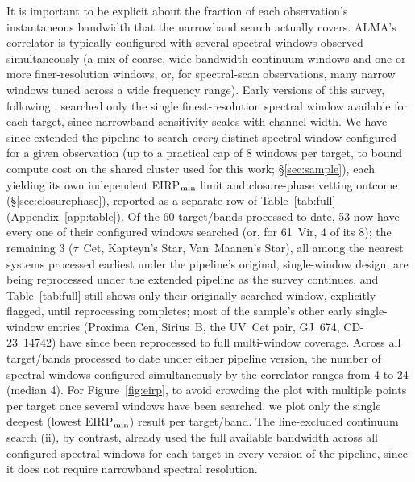\documentclass{openjournal}
\begin{document}
It is important to be explicit about the fraction of each observation's
instantaneous bandwidth that the narrowband search actually covers.
ALMA's correlator is typically configured with several spectral windows
observed simultaneously (a mix of coarse, wide-bandwidth continuum
windows and one or more finer-resolution windows, or, for spectral-scan
observations, many narrow windows tuned across a wide frequency range).
Early versions of this survey, following \citet{Mason2024}, searched
only the single finest-resolution spectral window available for each
target, since narrowband sensitivity scales with channel width. We have
since extended the pipeline to search \emph{every} distinct spectral
window configured for a given observation (up to a practical cap of 8
windows per target, to bound compute cost on the shared cluster used for
this work; \S\ref{sec:sample}), each yielding its own independent
EIRP$_{\rm min}$ limit and closure-phase vetting outcome
(\S\ref{sec:closurephase}), reported as a separate row of
Table~\ref{tab:full} (Appendix~\ref{app:table}). Of the 60 target/bands
processed to date, 53 now have every one of their configured windows
searched (or, for 61~Vir, 4 of its 8); the remaining 3 ($\tau$~Cet,
Kapteyn's Star, Van~Maanen's Star), all among the nearest systems
processed earliest under the pipeline's original, single-window design,
are being reprocessed under the extended pipeline as the survey
continues, and Table~\ref{tab:full} still shows only their
originally-searched window, explicitly flagged, until reprocessing
completes; most of the sample's other early single-window entries
(Proxima~Cen, Sirius~B, the UV~Cet pair, GJ~674, CD-23~14742) have since
been reprocessed to full multi-window coverage. Across all
target/bands processed to date under either pipeline version, the number
of spectral
windows configured simultaneously by the correlator ranges from 4 to 24
(median 4). For Figure~\ref{fig:eirp}, to avoid crowding the plot with
multiple points per target once several windows have been searched, we
plot only the single deepest (lowest EIRP$_{\rm min}$) result per
target/band. The line-excluded continuum search (ii), by contrast,
already used the full available bandwidth across all configured spectral
windows for each target in every version of the pipeline, since it does
not require narrowband spectral resolution.
\end{document}
